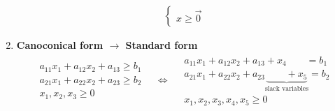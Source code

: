 \begin{enumerate}
\begin{gather*}
\begin{cases}
	x \geq \vec{0}
\end{cases}
\end{gather*}
\item \textbf{Canoconical form $\rightarrow$ Standard form}
\begin{gather*}
	\begin{split}
		a_{11}x_1 + a_{12}x_2 + a_{13} \geq b_1\\
		a_{21}x_1 + a_{22}x_2 + a_{23} \geq b_2\\
		x_1, x_2, x_3 \geq 0
	\end{split} \quad \Longleftrightarrow \quad
	\begin{split}
		a_{11}x_1 + a_{12}x_2 + a_{13} + x_4 \qquad = b_1\\
		a_{21}x_1 + a_{22}x_2 + a_{23} \underbrace{ \qquad + x_5}_{\text{slack variables}}= b_2\\
		x_1, x_2, x_3, x_4, x_5 \geq 0
	\end{split}
\end{gather*}
\end{enumerate}